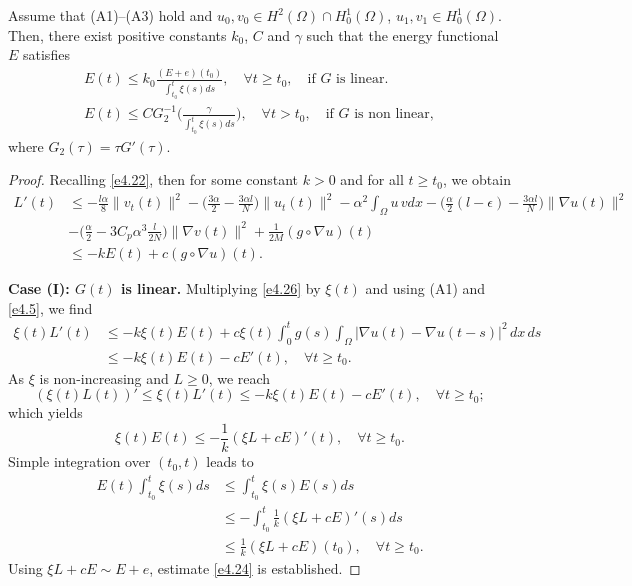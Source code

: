 \documentclass[reqno]{amsart}
\begin{document}
\begin{theorem} \label{thm13}
Assume that {\rm (A1)--(A3)} hold and $u_0,v_0 \in H^2(\Omega) \cap H^1_0(\Omega)$,
$u_1,v_1 \in H^1_0(\Omega)$. Then, there exist positive constants $k_0$, $C$ and
$\gamma$ such that the energy functional $E$ satisfies
\begin{gather}
E(t) \leq k_0 \frac{\left( E + e \right)(t_0)}{\int_{t_0}^t\xi(s)ds},\quad
\forall t\geq t_0, \quad  \text{if $G$ is linear.} \label{e4.24}\\
E(t)\leq C G_2^{-1}\Big( \frac{\gamma}{\int_{t_0}^t \xi(s)ds}\Big), \quad
 \forall t>t_0, \quad \text{if $G$ is non linear}, \label{e4.25}
\end{gather}
where $ G_2(\tau ) = \tau G'(\tau )$.
\end{theorem}

\begin{proof}
Recalling \eqref{e4.22}, then for some constant $k > 0$ and for all $t \geq t_0$,
we obtain
\begin{equation}
\begin{aligned}
L'(t) &\leq - \frac{l\alpha}{8} \| v_t(t) \|^2
 - \Big( \frac{3 \alpha}{2}- \frac{3\alpha l}{N}\Big) \| u_t(t) \|^2
  - \alpha^2 \int_{\Omega} u \, v dx
 - \Big( \frac{\alpha}{2} (l- \epsilon)- \frac{3\alpha l}{N} \Big) \| \nabla u(t) \|^2\\
&- \Big( \frac{\alpha}{2} - 3 C_p \alpha^{3} \frac{l}{2N} \Big)
 \| \nabla v (t)\|^2 +\frac{1}{2M} (g \circ \nabla u)(t)\\
& \leq -k E(t) + c (g \circ \nabla u)(t).
\end{aligned} \label{e4.26}
\end{equation}
\smallskip

\noindent\textbf{Case (I): $G(t)$ is linear.}
Multiplying \eqref{e4.26} by $\xi(t)$ and using (A1) and \eqref{e4.5},
we find
\begin{align*}
\xi(t) L'(t)
&\leq -k \xi(t) E(t) + c \xi(t) \int_0^{t} g(s)
 \int_{\Omega} |\nabla u(t) - \nabla u(t - s)|^2 \, dx \, ds\\
& \leq -k \xi(t) E (t) - c E'(t),\quad \forall t\geq t_0.
\end{align*}
As $\xi$ is non-increasing and $L \geq 0$, we reach
\[
(\xi(t)L(t))'\leq \xi(t)L'(t)\leq - k \xi(t) E(t) - c E'(t),\quad \forall t\geq t_0;
\]
which yields
\[
\xi(t) E(t)\leq -\frac{1}{k}(\xi L+c E)'(t),\quad \forall t\geq t_0.
\]
Simple integration over $(t_0, t)$ leads to
\begin{align*}
E(t) \int_{t_0}^t\xi(s)ds
&\leq \int_{t_0}^t \xi(s) E(s)ds \\
&\leq -\int_{t_0}^t \frac{1}{k}(\xi L+c E)'(s)ds \\
& \leq \frac{1}{k}(\xi L+c E)(t_0),\quad \forall t\geq t_0.
\end{align*}
Using $\xi L+c E \sim E+e$, estimate \eqref{e4.24} is established.
\smallskip


\end{proof}
\end{document}
